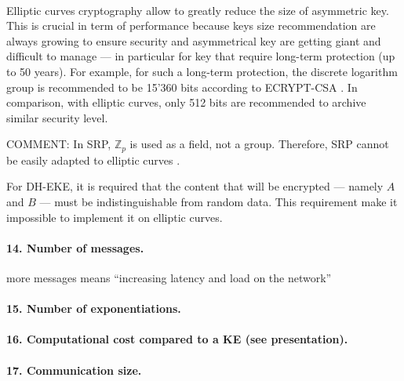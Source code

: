 \documentclass[../report.tex]{subfiles}
\begin{document}
\paragraph{}
Elliptic curves cryptography allow to greatly reduce the size of asymmetric key.
This is crucial in term of performance because keys size recommendation are always growing to ensure security and asymmetrical key are getting giant and difficult to manage --- in particular for key that require long-term protection (up to 50 years). For example, for such a long-term protection, the discrete logarithm group is recommended to be 15'360 bits according to ECRYPT-CSA \cite{https://www.keylength.com/en/3/}.
In comparison, with elliptic curves, only 512 bits are recommended to archive similar security level.

COMMENT: 
In SRP, $\mathbb{Z}_p$ is used as a field, not a group. Therefore, SRP cannot be easily adapted to elliptic curves \cite{CAA}.


For DH-EKE, it is required that the content that will be encrypted --- namely $A$ and $B$ --- must be indistinguishable from random data. 
This requirement make it impossible to implement it on elliptic curves\cite{https://tools.ietf.org/id/draft-ietf-kitten-krb-spake-preauth-00.html}. %


\paragraph{14. Number of messages.}
more messages means ``increasing latency and load on the network''


\paragraph{15. Number of exponentiations.}


\paragraph{16. Computational cost compared to a KE (see \cite{KHAPE_Paper} presentation).}


\paragraph{17. Communication size.}
\end{document}

